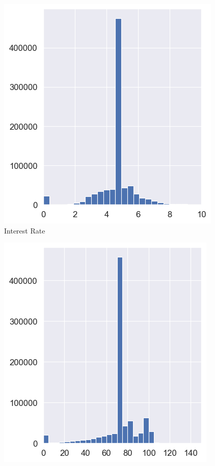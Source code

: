 \begin{figure}[!htbp]
    \centering
    \begin{minipage}{0.5\textwidth}
        \centering
        \includegraphics[width=\textwidth]{images/CHXX_Numerical_Distributions_2_IR.png}
        \small
        Interest Rate
    \end{minipage}\hfill
    \begin{minipage}{0.5\textwidth}
        \centering
        \includegraphics[width=\textwidth]{images/CHXX_Numerical_Distributions_2_LTVR.png}

\end{minipage}
\end{figure}

